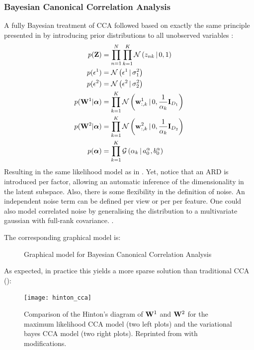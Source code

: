 \subsubsection{Bayesian Canonical Correlation Analysis} \label{section:bayesian_cca}
A fully Bayesian treatment of CCA followed based on exactly the same principle presented in  by introducing prior distributions to all unobserved variables \cite{Wang2007,Klami2013}:
\begin{align*} 
	p({\bf Z}) &= \prod_{n=1}^{N} \prod_{k=1}^{K} \mathcal{N}\left(z_{nk} \,|\, 0,1\right) \\
	p(\epsilon^{1}) &= \mathcal{N}\left(\epsilon^{1} \,|\, \sigma_{1}^{2}\right) \\
	p(\epsilon^{2}) &= \mathcal{N}\left(\epsilon^{2} \,|\, \sigma_{2}^{2}\right) \\
	p({\bf W}^1|\mbox{\boldmath $\alpha$}) &= \prod_{k=1}^{K} \mathcal{N}\left({\bf w}^{1}_{:,k} \,|\, 0,\frac{1}{\alpha_{k}}{\bf I}_{D_1}\right) \\
	p({\bf W}^2|\mbox{\boldmath $\alpha$}) &= \prod_{k=1}^{K} \mathcal{N}\left({\bf w}^{2}_{:,k} \,|\, 0,\frac{1}{\alpha_{k}}{\bf I}_{D_2}\right) \\
	p(\mbox{\boldmath $\alpha$}) &= \prod_{k=1}^{K} \mathcal{G}\left(\alpha_k \,|\, a_0^\alpha, b_0^\alpha\right)
\end{align*}
Resulting in the same likelihood model as in . Yet, notice that an ARD is introduced per factor, allowing an automatic inference of the dimensionality in the latent subspace.
Also, there is some flexibility in the definition of noise. An independent noise term can be defined per view or per per feature. One could also model correlated noise by generalising the distribution to a multivariate gaussian with full-rank covariance. \cite{Wang2007,Klami2013}.

The corresponding graphical model is:

\begin{figure}[H] \begin{center}
	
	\label{fig:graphical_bayesianCCA}
	\caption{Graphical model for Bayesian Canonical Correlation Analysis}
\end{center} \end{figure}

As expected, in practice this yields a more sparse solution than traditional CCA ():

\begin{figure}[H]
	\centering
	\texttt{[image: hinton\_cca]}
	\caption{Comparison of the Hinton's diagram of ${\bf W}^{1}$ and ${\bf W}^{2}$ for the maximum likelihood CCA model (two left plots) and the variational bayes CCA model (two right plots). Reprinted from \cite{Wang2007} with modifications.}
	\label{fig:hinton_cca}
\end{figure}


